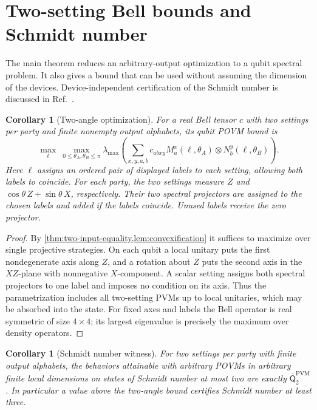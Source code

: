 \documentclass[11pt]{article}
\newtheorem{corollary}[theorem]{Corollary}
\theoremstyle{definition}
\newcommand{\Qbar}{\overline{\mathsf Q}}
\newcommand{\PVM}{\mathrm{PVM}}
\begin{document}
\section{Two-setting Bell bounds and Schmidt number}
\label{sec:operational}

The main theorem reduces an arbitrary-output optimization to a qubit spectral
problem. It also gives a bound that can be used without assuming the
dimension of the devices. Device-independent certification of the Schmidt
number is discussed in Ref.~\cite{hirsch2020}.

\begin{corollary}[Two-angle optimization]
For a real Bell tensor \(c\) with two settings per party and finite nonempty
output alphabets, its qubit POVM bound is
\[
 \max_{\ell}\ \max_{0\le\theta_A,\theta_B\le\pi}
 \lambda_{\max}\!\left(\sum_{x,y,a,b} c_{abxy}
      M^x_a(\ell,\theta_A)\otimes N^y_b(\ell,\theta_B)\right).
\]
Here \(\ell\) assigns an ordered pair of displayed labels to each setting,
allowing both labels to coincide. For each party, the two settings measure
\(Z\) and \(\cos\theta\,Z+\sin\theta\,X\), respectively. Their two spectral
projectors are assigned to the chosen labels and added if the labels
coincide. Unused labels receive the zero projector.
\end{corollary}

\begin{proof}
By \cref{thm:two-input-equality,lem:convexification} it suffices to maximize
over single projective strategies. On each qubit a local unitary puts the
first nondegenerate axis along \(Z\), and a rotation about \(Z\) puts the
second axis in the \(XZ\)-plane with nonnegative \(X\)-component. A scalar
setting assigns both spectral projectors to one label and imposes no
condition on its axis. Thus the parametrization includes all two-setting
PVMs up to local unitaries, which may be absorbed into the state.
For fixed axes and labels the Bell operator is real symmetric of size
\(4\times4\); its largest eigenvalue is precisely the maximum over density
operators.
\end{proof}

\begin{corollary}[Schmidt number witness]
For two settings per party with finite output alphabets, the behaviors
attainable with arbitrary POVMs in arbitrary finite local dimensions on
states of Schmidt number at most two are exactly \(\Qbar^{\PVM}_2\). In particular a value
above the two-angle bound certifies Schmidt number at least three.
\end{corollary}
\end{document}
